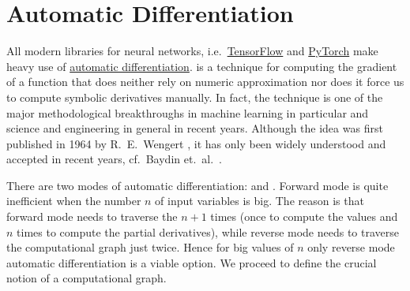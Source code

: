 \chapter{Automatic Differentiation}
All modern libraries for neural networks, i.e.~\href{https://www.tensorflow.org}{TensorFlow} and
\href{https://pytorch.org}{PyTorch} make heavy use of
\href{https://en.wikipedia.org/wiki/Automatic_differentiation}{automatic differentiation}.
 is a technique for computing the gradient of a function that does neither rely
on numeric approximation nor does it force us to compute symbolic derivatives manually.  In fact, the technique
is one of the major methodological breakthroughs in machine learning in particular and science and engineering
in general in recent years.  Although the idea was first published in 1964 by R.~E.~Wengert \cite{wengert:1964},
it has only been widely understood and accepted in recent years, cf.~Baydin et.~al.~\cite{baydin:2018}.

There are two modes of automatic differentiation:   and .  Forward
mode is quite inefficient when the number $n$ of input variables is big.  The reason is that forward mode needs
to traverse the  $n+1$ times (once to compute the values and $n$ times to compute the
partial derivatives), while reverse mode needs to traverse the computational graph just twice.  Hence for big
values of $n$ only reverse mode automatic differentiation is a viable option.  We proceed to define the crucial
notion of a computational graph. 

